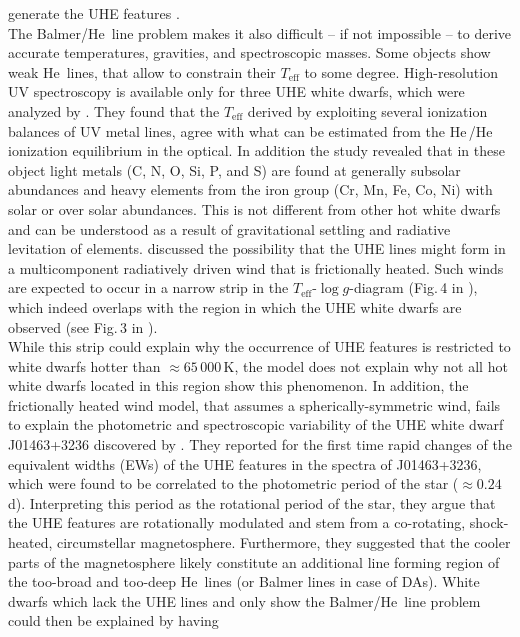\documentclass{aa}
\newcounter{Rco}
\newcommand{\Ionst}[1]{\setcounter{Rco}{#1}\Roman{Rco}}
\newcommand{\Ion}[2]{\mbox{#1\,{\scriptsize\Ionst{#2}}}}
\newcommand{\logg}{\mbox{$\log g$}\xspace}
\newcommand{\Teff}{\mbox{$T_\mathrm{eff}$}\xspace}
\begin{document}
generate the UHE features \citep{Werner+2014}.\\
The Balmer/\Ion{He}{2} line problem makes it also difficult -- if not
impossible -- to derive accurate temperatures, gravities, and spectroscopic
masses. Some objects show weak \Ion{He}{1} lines, that allow to constrain
their \Teff to some degree. High-resolution UV spectroscopy is available
only for three UHE white dwarfs, which were analyzed by \cite{Werner+2018b}.
They found that the \Teff derived by exploiting several ionization balances
of UV metal lines, agree with what can be estimated from the
\Ion{He}{1}/\Ion{He}{2} ionization equilibrium in the optical. In addition
the study revealed that in these object light metals (C, N, O, Si, P, and S)
are found at generally subsolar abundances and heavy elements from the iron
group (Cr, Mn, Fe, Co, Ni) with solar or over solar abundances. This is not
different from other hot white dwarfs and can be understood as a result of
gravitational settling and radiative levitation of elements.
\cite{Werner+2018b} discussed the possibility that the UHE lines might
form in a multicomponent radiatively driven wind that is frictionally
heated. Such winds are expected to occur in a narrow strip in the
\Teff-\logg-diagram (Fig.\,4 in \citealt{Krticka+Kubat2005}), which indeed
overlaps with the region in which the UHE white dwarfs are observed (see
Fig.\,3 in \citealt{Reindl+2014c}).\\
While this strip could explain why the occurrence of UHE features is restricted to
white dwarfs hotter than $\approx65\,000$\,K, the model does not explain why not all
hot white dwarfs located in this region show this phenomenon. In addition,
the frictionally heated wind model, that assumes a spherically-symmetric
wind, fails to explain the photometric and spectroscopic variability of the
UHE white dwarf J01463+3236 discovered by \cite{Reindl+2019}.
They reported for the first time rapid changes of the
equivalent widths (EWs) of the UHE features in the spectra of J01463+3236, which
were found to be correlated to the photometric period of the star ($\approx 0.24$\,d).
Interpreting this period as the rotational period of the star, they
argue that the UHE features are rotationally modulated and stem from a
co-rotating, shock-heated, circumstellar magnetosphere. Furthermore, they
suggested that the cooler parts of the magnetosphere likely constitute an
additional line forming region of the too-broad and too-deep \Ion{He}{2} lines (or
Balmer lines in case of DAs). White dwarfs which lack the UHE lines and only
show the Balmer/\Ion{He}{2} line problem could then be explained by having
\end{document}

